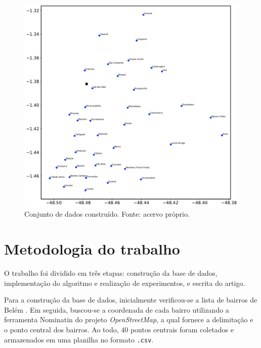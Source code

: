 \documentclass[12pt]{article}
\begin{document}
\begin{figure}[h!]
    \includegraphics[width=\linewidth]{figures/base_de_dados}
    \caption{Conjunto de dados construído. Fonte: acervo próprio.}
    \label{fig:base_de_dados}
\end{figure} 



\section{Metodologia do trabalho} %
\label{sec:metodologia}           %



O trabalho foi dividido em três etapas: construção da base de dados, implementação do algoritmo e realização de experimentos, e escrita do artigo.

Para a construção da base de dados, inicialmente verificou-se a lista de bairros de Belém \cite{belemwiki}. Em seguida, buscou-se a coordenada de cada bairro utilizando a ferramenta Nominatin do projeto \textit{OpenStreetMap}, a qual fornece a delimitação e o ponto central dos bairros. Ao todo, 40 pontos centrais foram coletados e armazenados em uma planilha no formato \texttt{.csv}.
\end{document}
